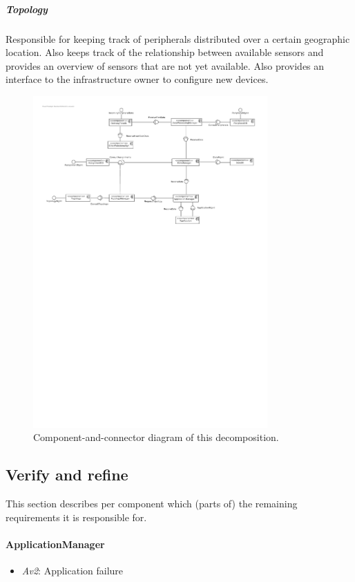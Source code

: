 \documentclass[english]{sareport}
\begin{document}
\subparagraph{Topology}
Responsible for keeping track of peripherals distributed over a certain geographic location. Also keeps track of the relationship between available sensors and provides an overview of sensors that are not yet available. Also provides an interface to the infrastructure owner to configure new devices.
\begin{figure}[!htp]
	\centering
	\includegraphics[width=0.8\textwidth]{component_diagram_1.pdf}
	\caption{Component-and-connector diagram of this decomposition.
	}\label{fig:it1-cc_main}
\end{figure}

\subsection{Verify and refine}
This section describes per component which (parts of) the remaining
requirements it is responsible for.

\paragraph{ApplicationManager}
\begin{itemize}
	\item \emph{Av2}: Application failure
\end{itemize}
\end{document}
